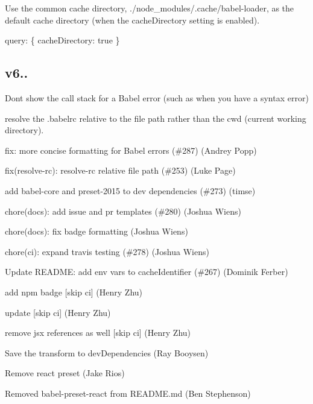 Use the common cache directory, {\ttfamily ./node\+\_\+modules/.cache/babel-\/loader}, as the default cache directory (when the cache\+Directory setting is enabled).


\begin{DoxyCode}
query: \{
  cacheDirectory: true
\}
\end{DoxyCode}


\subsection*{v6..}


\begin{DoxyItemize}
\item Don\textquotesingle{}t show the call stack for a Babel error (such as when you have a syntax error)
\end{DoxyItemize}




\begin{DoxyItemize}
\item resolve the .babelrc relative to the file path rather than the cwd (current working directory).
\begin{DoxyItemize}
\item fix\+: more concise formatting for Babel errors (\#287) (Andrey Popp)
\item fix(resolve-\/rc)\+: resolve-\/rc relative file path (\#253) (Luke Page)
\item add babel-\/core and preset-\/2015 to dev dependencies (\#273) (timse)
\item chore(docs)\+: add issue and pr templates (\#280) (Joshua Wiens)
\item chore(docs)\+: fix badge formatting (Joshua Wiens)
\item chore(ci)\+: expand travis testing (\#278) (Joshua Wiens)
\item Update R\+E\+A\+D\+ME\+: add env vars to cache\+Identifier (\#267) (Dominik Ferber)
\item add npm badge \mbox{[}skip ci\mbox{]} (Henry Zhu)
\item update \mbox{[}skip ci\mbox{]} (Henry Zhu)
\item remove jsx references as well \mbox{[}skip ci\mbox{]} (Henry Zhu)
\item Save the transform to dev\+Dependencies (Ray Booysen)
\item Remove \textquotesingle{}react\textquotesingle{} preset (Jake Rios)
\item Removed babel-\/preset-\/react from R\+E\+A\+D\+M\+E.\+md (Ben Stephenson)
\end{DoxyItemize}
\end{DoxyItemize}

